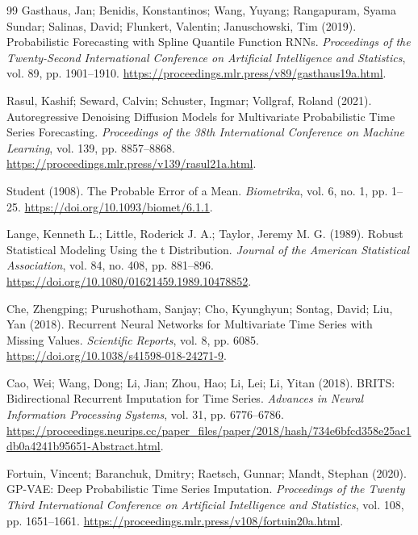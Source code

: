 \begin{thebibliography}{99}
 Gasthaus, Jan; Benidis, Konstantinos; Wang, Yuyang; Rangapuram, Syama Sundar; Salinas, David; Flunkert, Valentin; Januschowski, Tim (2019). Probabilistic Forecasting with Spline Quantile Function RNNs. \emph{Proceedings of the Twenty-Second International Conference on Artificial Intelligence and Statistics}, vol. 89, pp. 1901--1910. \url{https://proceedings.mlr.press/v89/gasthaus19a.html}.

 Rasul, Kashif; Seward, Calvin; Schuster, Ingmar; Vollgraf, Roland (2021). Autoregressive Denoising Diffusion Models for Multivariate Probabilistic Time Series Forecasting. \emph{Proceedings of the 38th International Conference on Machine Learning}, vol. 139, pp. 8857--8868. \url{https://proceedings.mlr.press/v139/rasul21a.html}.

 Student (1908). The Probable Error of a Mean. \emph{Biometrika}, vol. 6, no. 1, pp. 1--25. \url{https://doi.org/10.1093/biomet/6.1.1}.

 Lange, Kenneth L.; Little, Roderick J. A.; Taylor, Jeremy M. G. (1989). Robust Statistical Modeling Using the t Distribution. \emph{Journal of the American Statistical Association}, vol. 84, no. 408, pp. 881--896. \url{https://doi.org/10.1080/01621459.1989.10478852}.

 Che, Zhengping; Purushotham, Sanjay; Cho, Kyunghyun; Sontag, David; Liu, Yan (2018). Recurrent Neural Networks for Multivariate Time Series with Missing Values. \emph{Scientific Reports}, vol. 8, pp. 6085. \url{https://doi.org/10.1038/s41598-018-24271-9}.

 Cao, Wei; Wang, Dong; Li, Jian; Zhou, Hao; Li, Lei; Li, Yitan (2018). {BRITS}: Bidirectional Recurrent Imputation for Time Series. \emph{Advances in Neural Information Processing Systems}, vol. 31, pp. 6776--6786. \url{https://proceedings.neurips.cc/paper_files/paper/2018/hash/734e6bfcd358e25ac1db0a4241b95651-Abstract.html}.

 Fortuin, Vincent; Baranchuk, Dmitry; Raetsch, Gunnar; Mandt, Stephan (2020). {GP-VAE}: Deep Probabilistic Time Series Imputation. \emph{Proceedings of the Twenty Third International Conference on Artificial Intelligence and Statistics}, vol. 108, pp. 1651--1661. \url{https://proceedings.mlr.press/v108/fortuin20a.html}.


\end{thebibliography}
